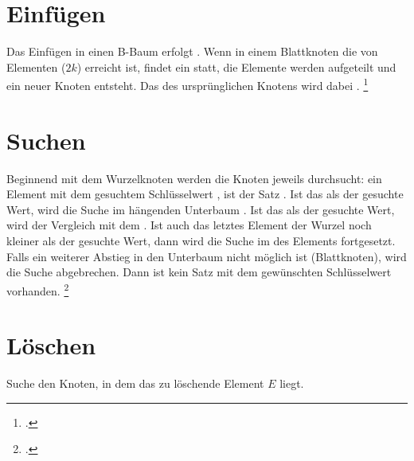 \documentclass{lehramt-informatik-haupt}
\begin{document}
%

\section{Einfügen}

Das Einfügen in einen B-Baum erfolgt .
Wenn in einem Blattknoten die  von Elementen
($2k$) erreicht ist, findet ein  statt, \dh die
Elemente werden aufgeteilt und ein neuer Knoten entsteht. Das
 des ursprünglichen Knotens wird dabei .
\footcite[Seite 32]{aud:fs:5}

%

\section{Suchen}

Beginnend mit dem Wurzelknoten werden die Knoten jeweils  durchsucht:
%
 ein Element mit dem gesuchtem Schlüsselwert
, ist der Satz .
%
Ist das  als der gesuchte Wert, wird die
Suche im  hängenden Unterbaum .
%
Ist das  als der gesuchte Wert, wird der
Vergleich mit dem .
%
Ist auch das letztes Element der Wurzel noch kleiner als der gesuchte
Wert, dann wird die Suche im  des Elements
fortgesetzt.
%
Falls ein weiterer Abstieg in den Unterbaum nicht möglich ist
(\dh Blattknoten), wird die Suche abgebrechen. Dann ist kein Satz mit
dem gewünschten Schlüsselwert vorhanden.
\footcite[Seite 37]{aud:fs:5}

%

\section{Löschen}

Suche den Knoten, in dem das zu löschende Element $E$ liegt.
\end{document}
